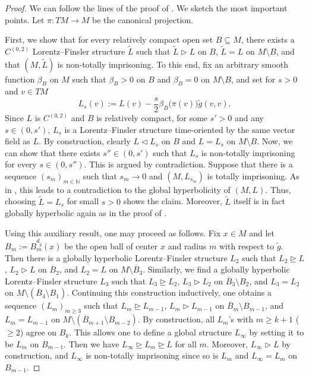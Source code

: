 \documentclass[a4paper,11pt]{article}
\numberwithin{equation}{section}
\theoremstyle{definition}
\theoremstyle{plain}
\newcommand{\N}{\mathbb N}
\begin{document}
\begin{proof}
    We can follow the lines of the proof of \cite[Thm.\ 4.3]{Saemann}. We sketch the most important points. 
    Let $\pi:TM \to M$ be the canonical projection.
    
    First, we show that for every relatively compact open set $B \subseteq M$, there exists a $C^{(0,2)}$ Lorentz--Finsler structure $\widetilde{L}$ such that $\widetilde{L} \triangleright L$ on $B$, $\widetilde{L} = L$ on $M \setminus B$, and that $(M,\widetilde{L})$ is non-totally imprisoning.
    To this end, fix an arbitrary smooth function $\beta_B$ on $M$ such that $\beta_B >0$ on $B$ and $\beta_B=0$ on $M \setminus B$, and set for $s>0$ and $v \in TM$
    \[
    L_s(v) :=L(v) -\frac{s}{2}\beta_B\bigl( \pi(v) \bigr) \tilde{g}(v,v).
    \]
    Since $L$ is $C^{(0,2)}$ and $B$ is relatively compact, for some $s'>0$ and any $s \in (0,s')$, $L_s$ is a Lorentz--Finsler structure time-oriented by the same vector field as $L$.
    By construction, clearly $L \triangleleft L_s$ on $B$ and $L=L_s$ on $M \setminus B$.
    Now, we can show that there exists $s'' \in (0,s')$ such that $L_s$ is non-totally imprisoning for every $s \in (0,s'')$.
    This is argued by contradiction. 
    Suppose that there is a sequence $(s_m)_{m \in \N}$ such that $s_m \to 0$ and $(M,L_{s_m})$ is totally imprisoning. 
    As in \cite[Thm.\ 4.3]{Saemann}, this leads to a contradiction to the global hyperbolicity of $(M,L)$. 
    Thus, choosing $\widetilde{L}=L_s$ for small $s>0$ shows the claim.
    Moreover, $\widetilde{L}$ itself is in fact globally hyperbolic again as in the proof of \cite[Thm.\ 4.3]{Saemann}. 

    Using this auxiliary result, one may proceed as follows. 
    Fix $x \in M$ and let $B_m:=B^{d_{\tilde g}}_m(x)$ be the open ball of center $x$ and radius $m$ with respect to $\tilde{g}$. 
    Then there is a globally hyperbolic Lorentz--Finsler structure $L_2$ such that $L_2 \trianglerighteq L$, $L_2 \triangleright L$ on $\overline{B}_2$, and $L_2 = L$ on $M \setminus \overline{B}_3$. 
    Similarly, we find a globally hyperbolic Lorentz--Finsler structure $L_3$ such that $L_3 \trianglerighteq L_2$, $L_3 \triangleright L_2$ on $\overline{B}_3 \setminus B_2$, and $L_3 = L_2$ on $M \setminus (\overline{B}_4 \setminus B_1)$. 
    Continuing this construction inductively, one obtains a sequence $(L_m)_{m \ge 3}$ such that $L_m \trianglerighteq L_{m-1}$, $L_m \triangleright L_{m-1}$ on $\overline{B}_m \setminus B_{m-1}$, and $L_m = L_{m-1}$ on $M \setminus (\overline{B}_{m+1} \setminus B_{m-2})$. 
    By construction, all $L_m$'s with $m \ge k+1$ ($\ge 2$) agree on $B_k$. 
    This allows one to define a global structure $L_\infty$ by setting it to be $L_m$ on $B_{m-1}$. 
    Then we have $L_\infty \trianglerighteq L_m \trianglerighteq L$ for all $m$. 
    Moreover, $L_\infty \triangleright L$ by construction, and $L_\infty$ is non-totally imprisoning since so is $L_m$ and $L_\infty=L_m$ on $B_{m-1}$.  
    

\end{proof}
\end{document}

